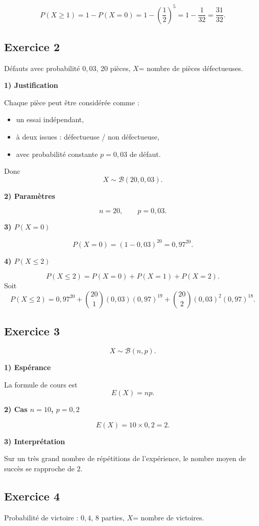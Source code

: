 \documentclass[11pt,a4paper]{article}
\begin{document}
\[
P(X\geq 1)=1-P(X=0)=1-\left(\frac12\right)^5=1-\frac1{32}=\frac{31}{32}.
\]

\subsection*{Exercice 2}
Défauts avec probabilité \(0{,}03\), 20 pièces, \(X\)= nombre de pièces défectueuses.

\textbf{1) Justification}

Chaque pièce peut être considérée comme :
\begin{itemize}
    \item un essai indépendant,
    \item à deux issues : défectueuse / non défectueuse,
    \item avec probabilité constante \(p=0{,}03\) de défaut.
\end{itemize}
Donc
\[
X\sim \mathcal{B}(20,0{,}03).
\]

\textbf{2) Paramètres}

\[
n=20,\qquad p=0{,}03.
\]

\textbf{3) \(P(X=0)\)}

\[
P(X=0)=(1-0{,}03)^{20}=0{,}97^{20}.
\]

\textbf{4) \(P(X\leq 2)\)}

\[
P(X\leq 2)=P(X=0)+P(X=1)+P(X=2).
\]
Soit
\[
P(X\leq 2)=0{,}97^{20}+\binom{20}{1}(0{,}03)(0{,}97)^{19}
+\binom{20}{2}(0{,}03)^2(0{,}97)^{18}.
\]

\subsection*{Exercice 3}
\[
X\sim \mathcal{B}(n,p).
\]

\textbf{1) Espérance}

La formule de cours est
\[
\boxed{E(X)=np.}
\]

\textbf{2) Cas \(n=10\), \(p=0{,}2\)}

\[
E(X)=10\times 0{,}2=2.
\]

\textbf{3) Interprétation}

Sur un très grand nombre de répétitions de l'expérience, le nombre moyen de succès se rapproche de \(2\).

\subsection*{Exercice 4}
Probabilité de victoire : \(0{,}4\), 8 parties, \(X\)= nombre de victoires.
\end{document}
